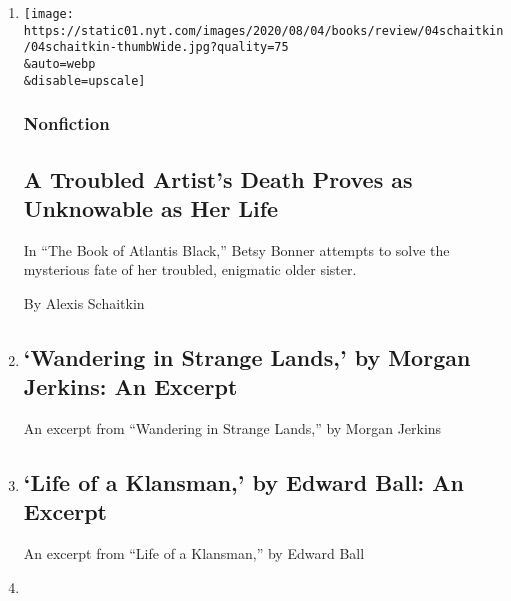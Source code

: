 \begin{enumerate}
\def\labelenumi{\arabic{enumi}.}
\item
  \href{/2020/08/04/books/review/betsy-bonner-the-book-of-atlantis-black.html}{}

  \texttt{[image: https://static01.nyt.com/images/2020/08/04/books/review/04schaitkin/04schaitkin-thumbWide.jpg?quality=75\\\&auto=webp\\\&disable=upscale]}

  \hypertarget{nonfiction-7}{%
  \subsubsection{Nonfiction}\label{nonfiction-7}}

  \hypertarget{a-troubled-artists-death-proves-as-unknowable-as-her-life}{%
  \subsection{A Troubled Artist's Death Proves as Unknowable as Her
  Life}\label{a-troubled-artists-death-proves-as-unknowable-as-her-life}}

  In ``The Book of Atlantis Black,'' Betsy Bonner attempts to solve the
  mysterious fate of her troubled, enigmatic older sister.

  By Alexis Schaitkin
\item
  \href{/2020/08/04/books/review/wandering-in-strange-lands-by-morgan-jerkins-an-excerpt.html}{}

  \hypertarget{wandering-in-strange-lands-by-morgan-jerkins-an-excerpt}{%
  \subsection{`Wandering in Strange Lands,' by Morgan Jerkins: An
  Excerpt}\label{wandering-in-strange-lands-by-morgan-jerkins-an-excerpt}}

  An excerpt from ``Wandering in Strange Lands,'' by Morgan Jerkins
\item
  \href{/2020/08/04/books/review/life-of-a-klansman-by-edward-ball-an-excerpt.html}{}

  \hypertarget{life-of-a-klansman-by-edward-ball-an-excerpt}{%
  \subsection{`Life of a Klansman,' by Edward Ball: An
  Excerpt}\label{life-of-a-klansman-by-edward-ball-an-excerpt}}

  An excerpt from ``Life of a Klansman,'' by Edward Ball
\item
  \href{/2020/08/04/books/review/fallout-hiroshima-hersey-lesley-m-m-blume.html}{}


\end{enumerate}

